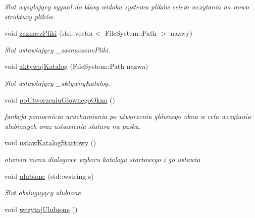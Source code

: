 \begin{DoxyCompactItemize}
\begin{DoxyCompactList}\small\item\em Slot wysyłający sygnał do klasy widoku systemu plików celem wczytania na nowo struktury plików. \item\end{DoxyCompactList}\item 
void \hyperlink{class_file_system_controller_a9f13e4a4707f4f84a92b1c17c328a82e}{zaznaczPliki} (std::vector$<$ FileSystem::Path $>$ nazwy)
\begin{DoxyCompactList}\small\item\em Slot ustawiający \_\-zaznaczonePliki. \item\end{DoxyCompactList}\item 
void \hyperlink{class_file_system_controller_a8ae6d051fbd3145ae829362a35e65acf}{aktywujKatalog} (FileSystem::Path nazwa)
\begin{DoxyCompactList}\small\item\em Slot ustawiający \_\-aktywnyKatalog. \item\end{DoxyCompactList}\item 
\hypertarget{class_file_system_controller_a0fab4a5b7c19ef200d6a833b8f04b866}{
void \hyperlink{class_file_system_controller_a0fab4a5b7c19ef200d6a833b8f04b866}{poUtworzeniuGlownegoOkna} ()}
\label{class_file_system_controller_a0fab4a5b7c19ef200d6a833b8f04b866}

\begin{DoxyCompactList}\small\item\em funkcja pomocnicza uruchamiania po utworzeniu głównego okna w celu wczytania ulubionych oraz ustawienia statusu na pasku. \item\end{DoxyCompactList}\item 
\hypertarget{class_file_system_controller_a645de037b80dd7c9e1f2a8ad2b041b13}{
void \hyperlink{class_file_system_controller_a645de037b80dd7c9e1f2a8ad2b041b13}{ustawKatalogStartowy} ()}
\label{class_file_system_controller_a645de037b80dd7c9e1f2a8ad2b041b13}

\begin{DoxyCompactList}\small\item\em otwiera menu dialogowe wyboru katalogu startowego i go ustawia \item\end{DoxyCompactList}\item 
void \hyperlink{class_file_system_controller_a7fe11479b20a72c0b6adf1ad74d15bbc}{ulubione} (std::wstring s)
\begin{DoxyCompactList}\small\item\em Slot obsługujący ulubione. \item\end{DoxyCompactList}\item 
\hypertarget{class_file_system_controller_a850c0b739650231def37267b209a96a7}{
void \hyperlink{class_file_system_controller_a850c0b739650231def37267b209a96a7}{wczytajUlubione} ()}
\label{class_file_system_controller_a850c0b739650231def37267b209a96a7}


\end{DoxyCompactItemize}
